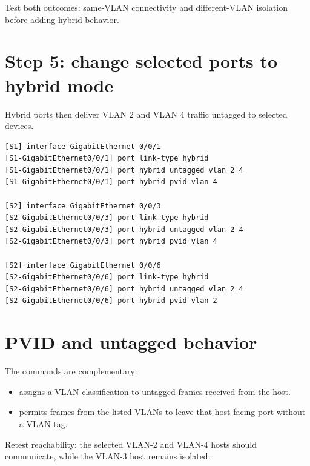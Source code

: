 \begin{verification}
Test both outcomes: same-VLAN connectivity and different-VLAN isolation before adding hybrid behavior.
\end{verification}

\section{Step 5: change selected ports to hybrid mode}
Hybrid ports then deliver VLAN 2 and VLAN 4 traffic untagged to selected devices.
\begin{lstlisting}[style=dcnterminal]
[S1] interface GigabitEthernet 0/0/1
[S1-GigabitEthernet0/0/1] port link-type hybrid
[S1-GigabitEthernet0/0/1] port hybrid untagged vlan 2 4
[S1-GigabitEthernet0/0/1] port hybrid pvid vlan 4

[S2] interface GigabitEthernet 0/0/3
[S2-GigabitEthernet0/0/3] port link-type hybrid
[S2-GigabitEthernet0/0/3] port hybrid untagged vlan 2 4
[S2-GigabitEthernet0/0/3] port hybrid pvid vlan 4

[S2] interface GigabitEthernet 0/0/6
[S2-GigabitEthernet0/0/6] port link-type hybrid
[S2-GigabitEthernet0/0/6] port hybrid untagged vlan 2 4
[S2-GigabitEthernet0/0/6] port hybrid pvid vlan 2
\end{lstlisting}

\section{PVID and untagged behavior}
The commands are complementary:
\begin{itemize}
\item {} assigns a VLAN classification to untagged frames received from the host.
\item {} permits frames from the listed VLANs to leave that host-facing port without a VLAN tag.
\end{itemize}
Retest reachability: the selected VLAN-2 and VLAN-4 hosts should communicate, while the VLAN-3 host remains isolated.

